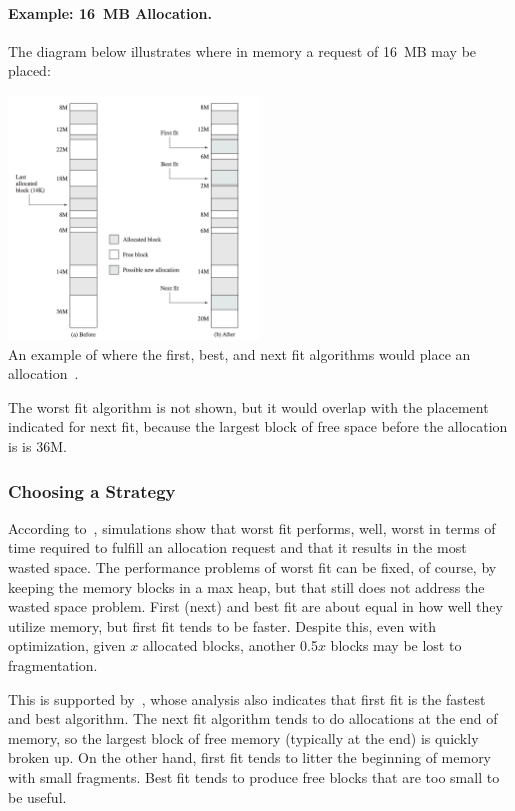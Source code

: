 \paragraph{Example: 16~MB Allocation.} The diagram below illustrates where in memory a request of 16~MB may be placed:

\begin{center}
\includegraphics[width=0.50\textwidth]{images/first-best-next.png}\\
An example of where the first, best, and next fit algorithms would place an allocation~\cite{osi}.
\end{center}

The worst fit algorithm is not shown, but it would overlap with the placement indicated for next fit, because the largest block of free space before the allocation is is 36M.

\subsubsection*{Choosing a Strategy}

According to~\cite{osc}, simulations show that worst fit performs, well, worst in terms of time required to fulfill an allocation request and that it results in the most wasted space. The performance problems of worst fit can be fixed, of course, by keeping the memory blocks in a max heap, but that still does not address the wasted space problem. First (next) and best fit are about equal in how well they utilize memory, but first fit tends to be faster. Despite this, even with optimization, given $x$ allocated blocks, another 0.5$x$ blocks may be lost to fragmentation.

This is supported by~\cite{osi}, whose analysis also indicates that first fit is the fastest and best algorithm. The next fit algorithm tends to do allocations at the end of memory, so the largest block of free memory (typically at the end) is quickly broken up. On the other hand, first fit tends to litter the beginning of memory with small fragments. Best fit tends to produce free blocks that are too small to be useful. 

